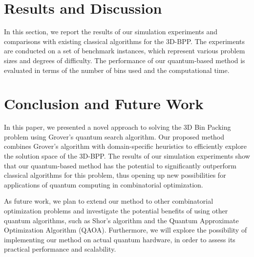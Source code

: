 \section{Results and Discussion} \label{sec:results}

In this section, we report the results of our simulation experiments and comparisons with existing classical algorithms for the 3D-BPP. The experiments are conducted on a set of benchmark instances, which represent various problem sizes and degrees of difficulty. The performance of our quantum-based method is evaluated in terms of the number of bins used and the computational time.

\section{Conclusion and Future Work} \label{sec:conclusion}

In this paper, we presented a novel approach to solving the 3D Bin Packing problem using Grover's quantum search algorithm. Our proposed method combines Grover's algorithm with domain-specific heuristics to efficiently explore the solution space of the 3D-BPP. The results of our simulation experiments show that our quantum-based method has the potential to significantly outperform classical algorithms for this problem, thus opening up new possibilities for applications of quantum computing in combinatorial optimization.

As future work, we plan to extend our method to other combinatorial optimization problems and investigate the potential benefits of using other quantum algorithms, such as Shor's algorithm and the Quantum Approximate Optimization Algorithm (QAOA). Furthermore, we will explore the possibility of implementing our method on actual quantum hardware, in order to assess its practical performance and scalability.

